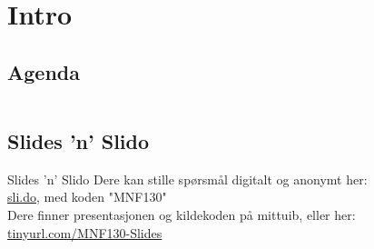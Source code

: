 \begin{frame}[t,plain]
    \titlepage
\end{frame}

\section{Intro}
\subsection*{Agenda}
\begin{frame}
    \begin{columns}[t]
        \begin{column}{.5\textwidth}
            \tableofcontents[sections={1-5}]
        \end{column}
        \begin{column}{.5\textwidth}
            \tableofcontents[sections={6-}]
        \end{column}
    \end{columns}
\end{frame}

\subsection*{Slides 'n' Slido}
\begin{frame}{Slides 'n' Slido}
    Dere kan stille spørsmål digitalt og anonymt her:\\
    \url{sli.do}, med koden "MNF130"\\

    Dere finner presentasjonen og kildekoden på mittuib, eller her:\\
    \url{tinyurl.com/MNF130-Slides}
\end{frame}